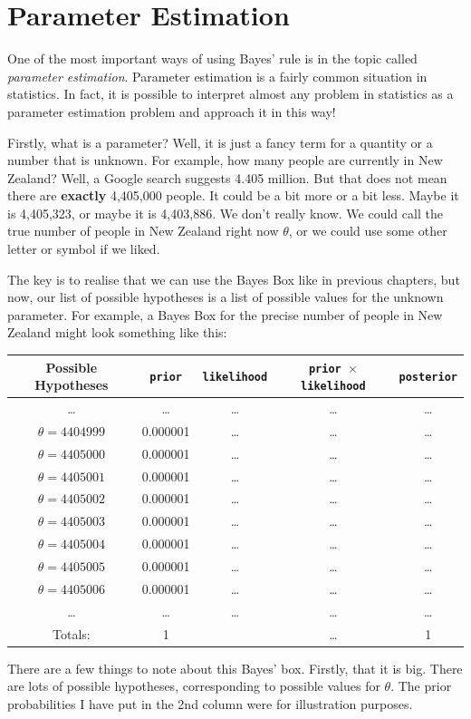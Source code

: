\chapter{Parameter Estimation}
One of the most important ways of using Bayes' rule is in the topic
called {\it parameter estimation}. Parameter estimation is a fairly common
situation in statistics. In fact, it is possible to interpret almost any
problem in statistics as a parameter estimation problem and approach it
in this way!

Firstly, what is a parameter? Well, it is just a fancy term for a quantity or
a number that is unknown. For example, how many people are currently in New
Zealand? Well, a Google search suggests 4.405 million. But that does not mean
there are {\bf exactly} 4,405,000 people. It could be a bit more or a bit
less. Maybe it is 4,405,323, or maybe it is 4,403,886. We don't really know.
We could call the true number of people in New Zealand right now $\theta$, or
we could use some other letter or symbol if we liked.

The key is to realise that we can use the Bayes Box like in previous chapters,
but now, our list of possible hypotheses is a list of possible values for
the unknown parameter. For example, a Bayes Box for the precise number of
people in New Zealand might look something like this:
\begin{table}[h!]
\begin{center}
\begin{tabular}{|c|c|c|c|c|}
\hline
{\bf Possible Hypotheses} & {\tt prior} & {\tt likelihood} &
{\tt prior $\times$ likelihood} & {\tt posterior}\\
\hline
\ldots & \ldots & \ldots & \ldots & \ldots\\
$\theta = 4404999$ & 0.000001 & \ldots   & \ldots  & \ldots\\
$\theta = 4405000$ & 0.000001 & \ldots   & \ldots  & \ldots\\
$\theta = 4405001$ & 0.000001 & \ldots   & \ldots  & \ldots\\
$\theta = 4405002$ & 0.000001 & \ldots   & \ldots  & \ldots\\
$\theta = 4405003$ & 0.000001 & \ldots   & \ldots  & \ldots\\
$\theta = 4405004$ & 0.000001 & \ldots   & \ldots  & \ldots\\
$\theta = 4405005$ & 0.000001 & \ldots   & \ldots  & \ldots\\
$\theta = 4405006$ & 0.000001 & \ldots   & \ldots  & \ldots\\
\ldots & \ldots & \ldots & \ldots & \ldots\\
\hline
Totals: & 1 & & \ldots & 1\\
\hline
\end{tabular}
\end{center}
\end{table}
There are a few things to note about this Bayes' box. Firstly, that it is big.
There are lots of possible hypotheses, corresponding to possible values for
$\theta$. The prior probabilities I have put in the 2nd column were for
illustration purposes. 


